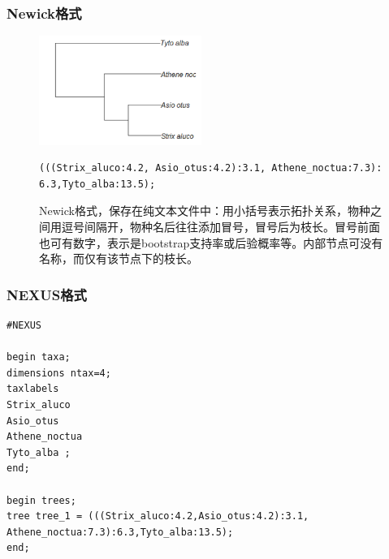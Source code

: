 \documentclass[UTF8]{ctexbeamer}
\begin{document}

\begin{frame}[fragile]
\begin{center}
\frametitle{Newick格式}
\begin{figure}
\includegraphics[height=1.4in]{tree2.png}\\
\begin{verbatim}
(((Strix_aluco:4.2, Asio_otus:4.2):3.1, Athene_noctua:7.3):
6.3,Tyto_alba:13.5);
\end{verbatim}
\caption{Newick格式，保存在纯文本文件中：用小括号表示拓扑关系，物种之间用逗号间隔开，物种名后往往添加冒号，冒号后为枝长。冒号前面也可有数字，表示是bootstrap支持率或后验概率等。内部节点可没有名称，而仅有该节点下的枝长。}
\end{figure}
\end{center}


\end{frame}

\begin{frame}[fragile]
\frametitle{NEXUS格式}
\begin{verbatim}
#NEXUS

begin taxa;
dimensions ntax=4; 
taxlabels 
Strix_aluco 
Asio_otus 
Athene_noctua 
Tyto_alba ;
end;

begin trees;
tree tree_1 = (((Strix_aluco:4.2,Asio_otus:4.2):3.1,
Athene_noctua:7.3):6.3,Tyto_alba:13.5);
end; 
\end{verbatim}
\end{frame}
\end{document}
